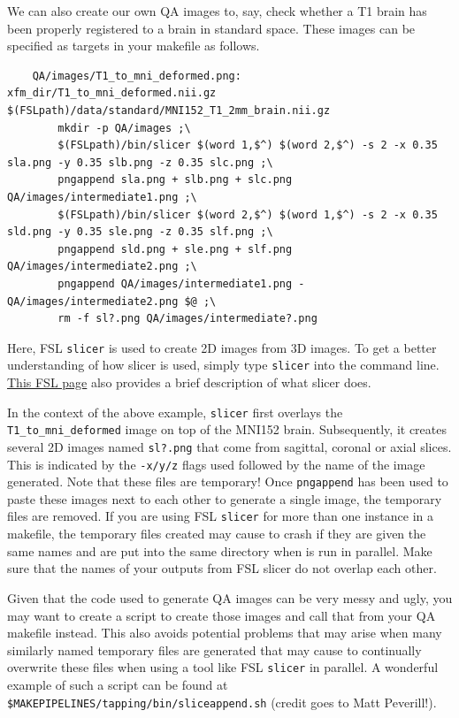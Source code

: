 We can also create our own QA images to, say, check whether a T1 brain has been properly registered to a brain in standard space. These images can be specified as targets in your makefile as follows.
\begin{lstlisting} 
	QA/images/T1_to_mni_deformed.png: xfm_dir/T1_to_mni_deformed.nii.gz $(FSLpath)/data/standard/MNI152_T1_2mm_brain.nii.gz 
		mkdir -p QA/images ;\
		$(FSLpath)/bin/slicer $(word 1,$^) $(word 2,$^) -s 2 -x 0.35 sla.png -y 0.35 slb.png -z 0.35 slc.png ;\
		pngappend sla.png + slb.png + slc.png QA/images/intermediate1.png ;\
		$(FSLpath)/bin/slicer $(word 2,$^) $(word 1,$^) -s 2 -x 0.35 sld.png -y 0.35 sle.png -z 0.35 slf.png ;\ 
		pngappend sld.png + sle.png + slf.png QA/images/intermediate2.png ;\ 
		pngappend QA/images/intermediate1.png - QA/images/intermediate2.png $@ ;\ 
		rm -f sl?.png QA/images/intermediate?.png
\end{lstlisting}

Here, FSL \texttt{slicer} is used to create 2D images from 3D images. To get a better understanding of how slicer is used, simply type \texttt{slicer} into the command line. \href{http://fsl.fmrib.ox.ac.uk/fsl/fslwiki/Miscvis}{This FSL page} also provides a brief description of what slicer does. 

In the context of the above example, \texttt{slicer} first overlays the \texttt{T1_to_mni_deformed} image on top of the MNI152 brain. Subsequently, it creates several 2D images named \texttt{sl?.png} that come from sagittal, coronal or axial slices. This is indicated by the \texttt{-x/y/z} flags used followed by the name of the image generated. Note that these files are temporary! Once \texttt{pngappend} has been used to paste these images next to each other to generate a single image, the temporary files are removed. If you are using FSL \texttt{slicer} for more than one instance in a makefile, the temporary files created may cause \maken{} to crash if they are given the same names and are put into the same directory when \maken{} is run in parallel. Make sure that the names of your outputs from FSL slicer do not overlap each other. 

Given that the code used to generate QA images can be very messy and ugly, you may want to create a \bashn{} script to create those images and call that from your QA makefile instead. This also avoids potential problems that may arise when many similarly named temporary files are generated that may cause \maken{} to continually overwrite these files when using a tool like FSL \texttt{slicer} in parallel. A wonderful example of such a script can be found at \texttt{\$MAKEPIPELINES/tapping/bin/sliceappend.sh} (credit goes to Matt Peverill!). 

